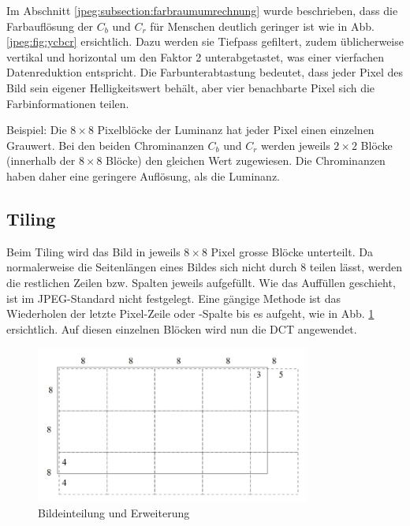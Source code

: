 Im Abschnitt \ref{jpeg:subsection:farbraumumrechnung} wurde beschrieben, dass die Farbauflösung der \(C_b\) und \(C_r\) für Menschen deutlich geringer ist wie in Abb. \ref{jpeg:fig:ycbcr} ersichtlich.
Dazu werden sie Tiefpass gefiltert, zudem üblicherweise vertikal und horizontal um den Faktor 2 unterabgetastet, was einer vierfachen Datenreduktion entspricht.
Die Farbunterabtastung bedeutet, dass jeder Pixel des Bild sein eigener Helligkeitswert behält, aber vier benachbarte Pixel sich die Farbinformationen teilen.

Beispiel: Die \(8\times8\) Pixelblöcke der Luminanz hat jeder Pixel einen einzelnen Grauwert.
Bei den beiden Chrominanzen \(C_b\) und \(C_r\) werden jeweils \(2\times2\) Blöcke (innerhalb der \(8\times8\) Blöcke) den gleichen Wert zugewiesen.
Die Chrominanzen haben daher eine geringere Auflösung, als die Luminanz.

\subsection{Tiling
\label{jpeg:subsection:tiling}}
Beim Tiling wird das Bild in jeweils \(8\times8\) Pixel grosse Blöcke unterteilt.
Da normalerweise die Seitenlängen eines Bildes sich nicht durch 8 teilen lässt, werden die restlichen Zeilen bzw. Spalten jeweils aufgefüllt.
Wie das Auffüllen geschieht, ist im JPEG-Standard nicht festgelegt.
Eine gängige Methode ist das Wiederholen der letzte Pixel-Zeile oder -Spalte bis es aufgeht, wie in Abb. \ref{jpeg:fig:tiling} ersichtlich.
Auf diesen einzelnen Blöcken wird nun die DCT angewendet.

\begin{figure}
    \centering
    \includegraphics[width=90mm]{papers/jpeg/pictures/unterteilung.pdf}
    \caption{Bildeinteilung und Erweiterung
        \label{jpeg:fig:tiling}}
\end{figure}

